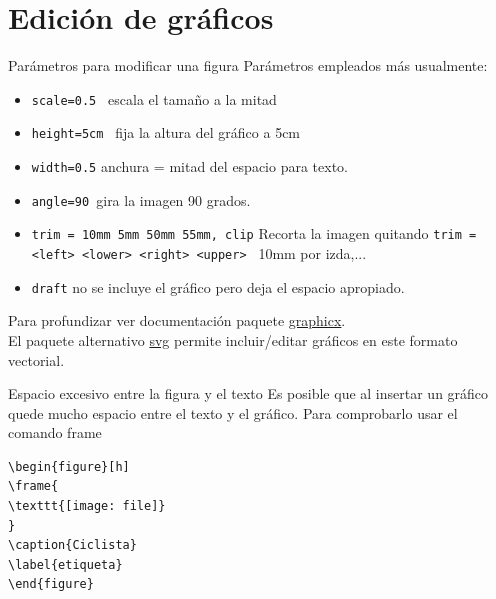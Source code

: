 \documentclass[10pt]{beamer}
\begin{document}
\section{Edición de gráficos}

\begin{frame}[fragile]{Parámetros para modificar una figura}
Parámetros empleados más usualmente:
\begin{itemize}
    \item \texttt{scale=0.5 } \hfill escala el tamaño a la mitad
    \item \texttt{height=5cm } \hfill fija la altura del gráfico a 5cm
    \item \texttt{width=0.5\textwidth } \hfill anchura = mitad del espacio para texto.
    \item \texttt{angle=90 }\hfill  gira la imagen 90 grados.
    \item \texttt{trim = 10mm 5mm 50mm 55mm, clip} \hfill Recorta la imagen quitando
\texttt{trim = <left> <lower> <right> <upper> } \hfill 10mm por izda,...
    \item \texttt{draft} \hfill no se incluye el gráfico pero deja el espacio apropiado.
\end{itemize}
\vspace{1cm}
Para profundizar ver documentaci\'on paquete \href{https://ctan.org/pkg/graphicx}{\color{blue} graphicx}. \\
{\scriptsize El paquete  alternativo \href{https://ctan.org/pkg/svg}{\color{blue} svg} permite incluir/editar gráficos en este formato vectorial.}
\end{frame}




\begin{frame}[fragile]{Espacio excesivo entre la figura y el texto}
Es posible que al insertar un gráfico quede mucho espacio entre
el texto y el gráfico.  Para comprobarlo usar el comando frame
\begin{figure}
\end{figure}
\begin{verbatim}
\begin{figure}[h]
\frame{
\texttt{[image: file]}
}
\caption{Ciclista}
\label{etiqueta}
\end{figure}
\end{verbatim}
\end{frame}
\end{document}
